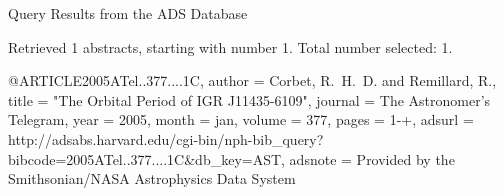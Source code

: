 Query Results from the ADS Database


Retrieved 1 abstracts, starting with number 1.  Total number selected: 1.

@ARTICLE{2005ATel..377....1C,
   author = {{Corbet}, R.~H.~D. and {Remillard}, R.},
    title = "{The Orbital Period of IGR J11435-6109}",
  journal = {The Astronomer's Telegram},
     year = 2005,
    month = jan,
   volume = 377,
    pages = {1-+},
   adsurl = {http://adsabs.harvard.edu/cgi-bin/nph-bib_query?bibcode=2005ATel..377....1C&db_key=AST},
  adsnote = {Provided by the Smithsonian/NASA Astrophysics Data System}
}


